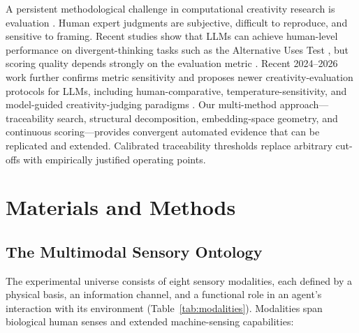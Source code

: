 \documentclass[pdflatex,sn-mathphys-num]{sn-jnl}
\begin{document}
A persistent methodological challenge in computational creativity research is evaluation
\cite{wiggins2006preliminary,colton2012computational}.  Human expert judgments are subjective,
difficult to reproduce, and sensitive to framing.  Recent studies show that LLMs can
achieve human-level performance on divergent-thinking tasks such as the Alternative Uses Test
\cite{stevenson2022gpt}, but scoring quality depends strongly on the evaluation metric
\cite{organisciak2023beyond}.  Recent 2024--2026 work further confirms metric sensitivity and
proposes newer creativity-evaluation protocols for LLMs, including human-comparative,
temperature-sensitivity, and model-guided creativity-judging paradigms
\cite{zhao2024assessing,wang2024canai,peeperkorn2024temperature,bellemare2024divergent,ismayilzada2024shortstory,nakajima2026beyonddivergent,olson2024steering}.  Our multi-method approach---traceability
search, structural decomposition, embedding-space geometry, and continuous scoring---provides
convergent automated evidence that can be replicated and extended.  Calibrated traceability
thresholds replace arbitrary cut-offs with empirically justified operating points.

\section{Materials and Methods}
\label{sec:methods}

\subsection{The Multimodal Sensory Ontology}

The experimental universe consists of eight sensory modalities, each defined by a physical
basis, an information channel, and a functional role in an agent's interaction with its
environment (Table~\ref{tab:modalities}).  Modalities span biological human senses and
extended machine-sensing capabilities:
\end{document}
